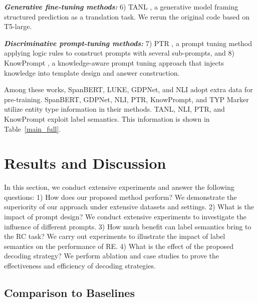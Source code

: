 \documentclass[11pt]{article}
\begin{document}
\noindent\textbf{ \textit{Generative fine-tuning methods:} } 6) TANL \cite{DBLP:conf/iclr/PaoliniAKMAASXS21}, a generative model framing structured prediction as a translation task. We rerun the original code based on T5-large.

\noindent\textbf{ \textit{Discriminative prompt-tuning methods:}} 
7) PTR \cite{DBLP:journals/corr/abs-2105-11259}, a prompt tuning method applying logic rules to construct prompts with
several sub-prompts, and 8) KnowPrompt \cite{DBLP:journals/corr/abs-2104-07650}, a knowledge-aware prompt tuning approach that injects knowledge into template design and answer construction. 

Among these works, SpanBERT, LUKE, GDPNet, and NLI adopt extra data for pre-training. SpanBERT, GDPNet, NLI, PTR, KnowPrompt, and TYP Marker utilize entity type information in their methods. TANL, NLI, PTR, and KnowPrompt exploit label semantics. This information is shown in Table~\ref{main_full}.

\section{Results and Discussion}

In this section, we conduct extensive experiments and answer the following questions: 
1) How does our proposed method perform? We demonstrate the superiority of our approach under extensive datasets and settings.
2) What is the impact of prompt design? We conduct extensive experiments to investigate the influence of different prompts.
3) How much benefit can label semantics bring to the RC task? We carry out experiments to illustrate the impact of label semantics on the performance of RE. 
4) What is the effect of the proposed decoding strategy? We perform ablation and case studies to prove the effectiveness and efficiency of decoding strategies.

\subsection{Comparison to Baselines}
\end{document}
